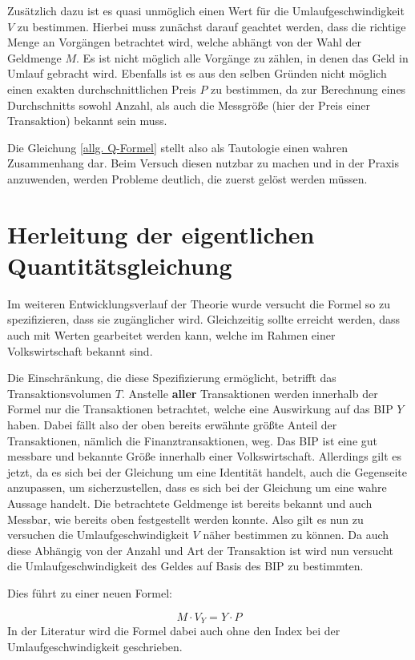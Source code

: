Zusätzlich dazu ist es quasi unmöglich einen Wert für die Umlaufgeschwindigkeit $V$ zu bestimmen. Hierbei muss zunächst darauf geachtet werden, dass die richtige Menge an Vorgängen betrachtet wird, welche abhängt von der Wahl der Geldmenge $M$. Es ist nicht möglich alle Vorgänge zu zählen, in denen das Geld in Umlauf gebracht wird.
Ebenfalls ist es aus den selben Gründen nicht möglich einen exakten durchschnittlichen Preis $P$ zu bestimmen, da zur Berechnung eines Durchschnitts sowohl Anzahl, als auch die Messgröße (hier der Preis einer Transaktion) bekannt sein muss.

Die Gleichung \vref{allg. Q-Formel} stellt also als Tautologie einen wahren Zusammenhang dar. Beim Versuch diesen nutzbar zu machen und in der Praxis anzuwenden, werden Probleme deutlich, die zuerst gelöst werden müssen.

\section{Herleitung der eigentlichen Quantitätsgleichung}
Im weiteren Entwicklungsverlauf der Theorie wurde versucht die Formel so zu spezifizieren, dass sie zugänglicher wird. Gleichzeitig sollte erreicht werden, dass auch mit Werten gearbeitet werden kann, welche im Rahmen einer Volkswirtschaft bekannt sind.

Die Einschränkung, die diese Spezifizierung ermöglicht, betrifft das Transaktionsvolumen $T$. Anstelle \textbf{aller} Transaktionen werden innerhalb der Formel nur die Transaktionen betrachtet, welche eine Auswirkung auf das BIP $Y$ haben. Dabei fällt also der oben bereits erwähnte größte Anteil der Transaktionen, nämlich die Finanztransaktionen, weg. Das BIP ist eine gut messbare und bekannte Größe innerhalb einer Volkswirtschaft. Allerdings gilt es jetzt, da es sich bei der Gleichung um eine Identität handelt, auch die Gegenseite anzupassen, um sicherzustellen, dass es sich bei der Gleichung um eine wahre Aussage handelt. Die betrachtete Geldmenge ist bereits bekannt und auch Messbar, wie bereits oben festgestellt werden konnte. Also gilt es nun zu versuchen die Umlaufgeschwindigkeit $V$ näher bestimmen zu können. Da auch diese Abhängig von der Anzahl und Art der Transaktion ist wird nun versucht die Umlaufgeschwindigkeit des Geldes auf Basis des BIP zu bestimmten.

Dies führt zu einer neuen Formel: 

$$ M \cdot V_Y = Y \cdot P$$\label{QFormel}
In der Literatur wird die Formel dabei auch ohne den Index bei der Umlaufgeschwindigkeit geschrieben.

